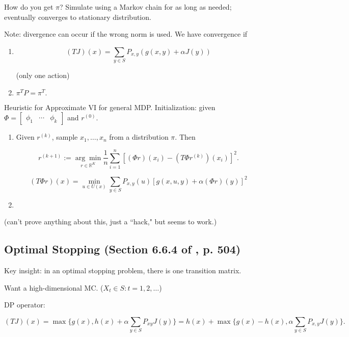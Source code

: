 How do you get \(\pi\)? Simulate using a Markov chain for as long as needed; eventually converges to stationary distribution. 

Note: divergence can occur if the wrong norm is used. We have convergence if 

\begin{enumerate}

\item 

\[
(TJ)(x) = \sum_{y \in S} P_{x,y} (g(x,y) + \alpha J(y)) 
\]

(only one action)

\item \( \pi^T P = \pi^T.\)

\end{enumerate}

Heuristic for Approximate VI for general MDP. Initialization: given \(\Phi = \begin{bmatrix} \phi_1 & \cdots & \phi_k \end{bmatrix}\) and \(r^{(0)}\).

\begin{enumerate}

\item Given \(r^{(k)}\), sample \(x_1, \ldots, x_n\) from a distribution \(\pi\). Then

\[
r^{(k+1)} := \underset{r \in \mathbb{R}^K}{\arg \min} \frac{1}{n} \sum_{i=1}^n \left[ ( \Phi r)(x_i) - (T \Phi r^{(k)})(x_i) \right]^2.
\]

\[
(T \Phi r)(x) = \min_{u \in U(x)} \sum_{y \in S} P_{x,y}(u) \left[ g(x, u, y) + \alpha( \Phi r)(y) \right]^2
\]

\item

\end{enumerate}

(can't prove anything about this, just a ``hack," but seems to work.)

\subsection{Optimal Stopping (Section 6.6.4 of \citet{v2_bertsekas2012dynamic}, p. 504)}

Key insight: in an optimal stopping problem, there is one transition matrix.

Want a high-dimensional MC. (\(X_t \in S: t= 1, 2, \ldots\))

DP operator:

\[
(TJ)(x) = \max\{g(x), h(x) + \alpha \sum_{y \in S} P_{xy} J(y) \} = h(x) + \max\{ g(x) - h(x), \alpha \sum_{y \in S} P_{x,y} J(y) \}.
\]

